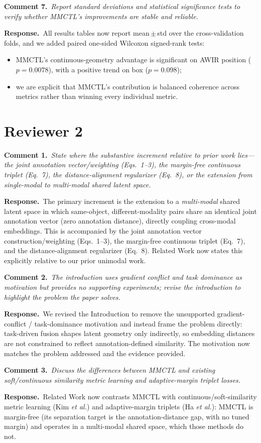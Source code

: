 \documentclass[10pt,twocolumn,letterpaper]{article}
\newcommand{\cmt}[2]{\smallskip\noindent\textbf{Comment #1.}\ \textit{#2}\par}
\newcommand{\resp}[1]{\noindent\textbf{Response.}\ #1\par}
\begin{document}
\cmt{7}{Report standard deviations and statistical significance tests to verify
whether MMCTL's improvements are stable and reliable.}
\resp{All results tables now report mean\,$\pm$\,std over the cross-validation
folds, and we added paired one-sided Wilcoxon signed-rank tests:}
\begin{itemize}
  \item MMCTL's continuous-geometry advantage is significant on AWIR position ($p{=}0.0078$), with a positive trend on box ($p{=}0.098$);
  \item we are explicit that MMCTL's contribution is balanced coherence across metrics rather than winning every individual metric.
\end{itemize}

\section{Reviewer 2}

\cmt{1}{State where the substantive increment relative to prior work lies---the
joint annotation vector/weighting (Eqs.~1--3), the margin-free continuous triplet
(Eq.~7), the distance-alignment regularizer (Eq.~8), or the extension from
single-modal to multi-modal shared latent space.}
\resp{The primary increment is the extension to a \emph{multi-modal} shared
latent space in which same-object, different-modality pairs share an identical
joint annotation vector (zero annotation distance), directly coupling cross-modal
embeddings. This is accompanied by the joint annotation vector
construction/weighting (Eqs.~1--3), the margin-free continuous triplet (Eq.~7),
and the distance-alignment regularizer (Eq.~8). Related Work now states this
explicitly relative to our prior unimodal work.}

\cmt{2}{The introduction uses gradient conflict and task dominance as motivation
but provides no supporting experiments; revise the introduction to highlight the
problem the paper solves.}
\resp{We revised the Introduction to remove the unsupported gradient-conflict /
task-dominance motivation and instead frame the problem directly: task-driven
fusion shapes latent geometry only indirectly, so embedding distances are not
constrained to reflect annotation-defined similarity. The motivation now matches
the problem addressed and the evidence provided.}

\cmt{3}{Discuss the differences between MMCTL and existing soft/continuous
similarity metric learning and adaptive-margin triplet losses.}
\resp{Related Work now contrasts MMCTL with continuous/soft-similarity metric
learning (Kim \emph{et al.}) and adaptive-margin triplets (Ha \emph{et al.}):
MMCTL is margin-free (its separation target is the annotation-distance gap, with
no tuned margin) and operates in a multi-modal shared space, which those methods
do not.}
\end{document}

